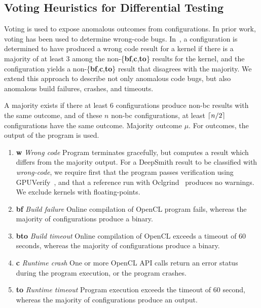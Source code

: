 \subsection{Voting Heuristics for Differential Testing}

Voting is used to expose anomalous outcomes from configurations. In prior work, voting has been used to determine wrong-code bugs. In~\cite{Lidbury2015a}, a configuration is determined to have produced a wrong code result for a kernel if there is a majority of at least 3 among the non-\{\textbf{bf},\textbf{c},\textbf{to}\} results for the kernel, and the configuration yields a non-\{\textbf{bf},\textbf{c},\textbf{to}\} result that disagrees with the majority. We extend this approach to describe not only anomalous code bugs, but also anomalous build failures, crashes, and timeouts.

A majority exists if there at least 6 configurations produce non-bc results with the same outcome, and of these $n$ non-bc configurations, at least $\lceil n/2\rceil$ configurations have the same outcome. Majority outcome $\mu$. For \cmark outcomes, the output of the program is used.

%
\begin{enumerate}
	\item \textbf{w} \emph{Wrong code} Program terminates gracefully, but computes a result which differs from the majority output. For a DeepSmith result to be classified with \emph{wrong-code}, we require first that the program passes verification using GPUVerify~\cite{Betts2012}, and that a reference run with Oclgrind~\cite{Price2015} produces no warnings. We exclude kernels with floating-points.
	\item \textbf{bf} \emph{Build failure} Online compilation of OpenCL program fails, whereas the majority of configurations produce a binary.
	\item \textbf{bto} \emph{Build timeout} Online compilation of OpenCL exceeds a timeout of 60 seconds, whereas the majority of configurations produce a binary.
	\item \textbf{c} \emph{Runtime crash} One or more OpenCL API calls return an error status during the program execution, or the program crashes.
	\item \textbf{to} \emph{Runtime timeout} Program execution exceeds the timeout of 60 second, whereas the majority of configurations produce an output.
\end{enumerate}


